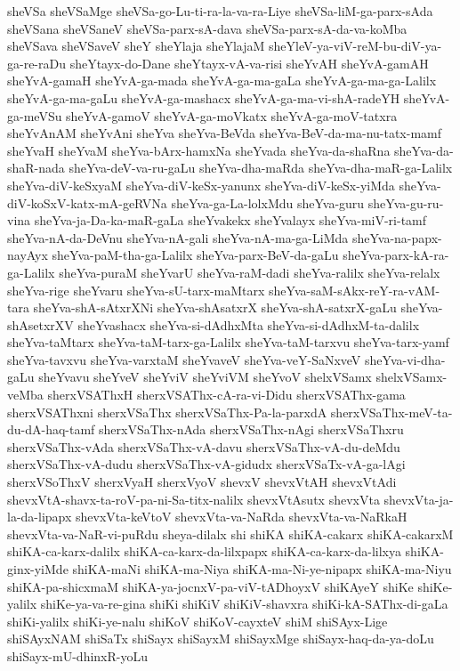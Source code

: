 {sheVSa
sheVSaMge
sheVSa-go-Lu-ti-ra-la-va-ra-Liye
sheVSa-liM-ga-parx-sAda
sheVSana
sheVSaneV
sheVSa-parx-sA-dava
sheVSa-parx-sA-da-va-koMba
sheVSava
sheVSaveV
sheY
sheYlaja
sheYlajaM
sheYleV-ya-viV-reM-bu-diV-ya-ga-re-raDu
sheYtayx-do-Dane
sheYtayx-vA-va-risi
sheYvAH
sheYvA-gamAH
sheYvA-gamaH
sheYvA-ga-mada
sheYvA-ga-ma-gaLa
sheYvA-ga-ma-ga-Lalilx
sheYvA-ga-ma-gaLu
sheYvA-ga-mashacx
sheYvA-ga-ma-vi-shA-radeYH
sheYvA-ga-meVSu
sheYvA-gamoV
sheYvA-ga-moVkatx
sheYvA-ga-moV-tatxra
sheYvAnAM
sheYvAni
sheYva
sheYva-BeVda
sheYva-BeV-da-ma-nu-tatx-mamf
sheYvaH
sheYvaM
sheYva-bArx-hamxNa
sheYvada
sheYva-da-shaRna
sheYva-da-shaR-nada
sheYva-deV-va-ru-gaLu
sheYva-dha-maRda
sheYva-dha-maR-ga-Lalilx
sheYva-diV-keSxyaM
sheYva-diV-keSx-yanunx
sheYva-diV-keSx-yiMda
sheYva-diV-koSxV-katx-mA-geRVNa
sheYva-ga-La-lolxMdu
sheYva-guru
sheYva-gu-ru-vina
sheYva-ja-Da-ka-maR-gaLa
sheYvakekx
sheYvalayx
sheYva-miV-ri-tamf
sheYva-nA-da-DeVnu
sheYva-nA-gali
sheYva-nA-ma-ga-LiMda
sheYva-na-papx-nayAyx
sheYva-paM-tha-ga-Lalilx
sheYva-parx-BeV-da-gaLu
sheYva-parx-kA-ra-ga-Lalilx
sheYva-puraM
sheYvarU
sheYva-raM-dadi
sheYva-ralilx
sheYva-relalx
sheYva-rige
sheYvaru
sheYva-sU-tarx-maMtarx
sheYva-saM-sAkx-reY-ra-vAM-tara
sheYva-shA-sAtxrXNi
sheYva-shAsatxrX
sheYva-shA-satxrX-gaLu
sheYva-shAsetxrXV
sheYvashacx
sheYva-si-dAdhxMta
sheYva-si-dAdhxM-ta-dalilx
sheYva-taMtarx
sheYva-taM-tarx-ga-Lalilx
sheYva-taM-tarxvu
sheYva-tarx-yamf
sheYva-tavxvu
sheYva-varxtaM
sheYvaveV
sheYva-veY-SaNxveV
sheYva-vi-dha-gaLu
sheYvavu
sheYveV
sheYviV
sheYviVM
sheYvoV
shelxVSamx
shelxVSamx-veMba
sherxVSAThxH
sherxVSAThx-cA-ra-vi-Didu
sherxVSAThx-gama
sherxVSAThxni
sherxVSaThx
sherxVSaThx-Pa-la-parxdA
sherxVSaThx-meV-ta-du-dA-haq-tamf
sherxVSaThx-nAda
sherxVSaThx-nAgi
sherxVSaThxru
sherxVSaThx-vAda
sherxVSaThx-vA-davu
sherxVSaThx-vA-du-deMdu
sherxVSaThx-vA-dudu
sherxVSaThx-vA-gidudx
sherxVSaTx-vA-ga-lAgi
sherxVSoThxV
sherxVyaH
sherxVyoV
shevxV
shevxVtAH
shevxVtAdi
shevxVtA-shavx-ta-roV-pa-ni-Sa-titx-nalilx
shevxVtAsutx
shevxVta
shevxVta-ja-la-da-lipapx
shevxVta-keVtoV
shevxVta-va-NaRda
shevxVta-va-NaRkaH
shevxVta-va-NaR-vi-puRdu
sheya-dilalx
shi
shiKA
shiKA-cakarx
shiKA-cakarxM
shiKA-ca-karx-dalilx
shiKA-ca-karx-da-lilxpapx
shiKA-ca-karx-da-lilxya
shiKA-ginx-yiMde
shiKA-maNi
shiKA-ma-Niya
shiKA-ma-Ni-ye-nipapx
shiKA-ma-Niyu
shiKA-pa-shicxmaM
shiKA-ya-jocnxV-pa-viV-tADhoyxV
shiKAyeY
shiKe
shiKe-yalilx
shiKe-ya-va-re-gina
shiKi
shiKiV
shiKiV-shavxra
shiKi-kA-SAThx-di-gaLa
shiKi-yalilx
shiKi-ye-nalu
shiKoV
shiKoV-cayxteV
shiM
shiSAyx-Lige
shiSAyxNAM
shiSaTx
shiSayx
shiSayxM
shiSayxMge
shiSayx-haq-da-ya-doLu
shiSayx-mU-dhinxR-yoLu
}
